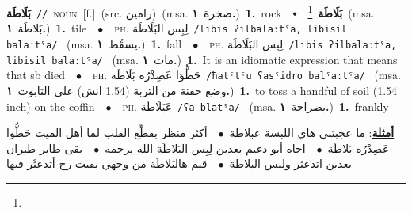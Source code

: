 \documentclass[10pt,a4paper,twoside]{article} %
\begin{document}
\begin{multicols}{2}
{\setlength\topsep{0pt}\textbf{\foreignlanguage{arabic}{بَلَاطَة}}\ {\color{gray}\texttt{//}\color{black}}\ \textsc{noun}\ [f.]\ (src. \color{gray}\foreignlanguage{arabic}{رامين}\color{black})\ \color{gray}(msa. \foreignlanguage{arabic}{صخرة}~\foreignlanguage{arabic}{\textbf{١.}})\color{black}\ \textbf{1.}~rock\ \ $\smblkdiamond$\ \ \setlength\topsep{0pt}\textbf{\foreignlanguage{arabic}{بَلَاطَة}}\ \footnote{}\ \color{gray}(msa. \foreignlanguage{arabic}{بَلاطَة}~\foreignlanguage{arabic}{\textbf{١.}})\color{black}\ \textbf{1.}~tile\ \ $\bullet$\ \ \textsc{ph.} \color{gray} \foreignlanguage{arabic}{لِبِس البَلَاطَة}\color{black}\ {\color{gray}\texttt{/{\sffamily libis ʔilbalaːtˤa, libisil balaːtˤa}/}\color{black}}\ \color{gray} (msa. \foreignlanguage{arabic}{يسقُط}~\foreignlanguage{arabic}{\textbf{١.}})\color{black}\ \textbf{1.}~fall\ \ $\bullet$\ \ \textsc{ph.} \color{gray} \foreignlanguage{arabic}{لِبِس البَلَاطَة}\color{black}\ {\color{gray}\texttt{/{\sffamily libis ʔilbalaːtˤa, libisil balaːtˤa}/}\color{black}}\ \color{gray} (msa. \foreignlanguage{arabic}{مات}~\foreignlanguage{arabic}{\textbf{١.}})\color{black}\ \textbf{1.}~It is an idiomatic expression that means that sb died\ \ $\bullet$\ \ \textsc{ph.} \color{gray} \foreignlanguage{arabic}{حَطُّوَا عَصِدْرُه بَلَاطَة}\color{black}\ {\color{gray}\texttt{/{\sffamily ħatˤtˤu ʕasˤidro balˤaːtˤa}/}\color{black}}\ \color{gray} (msa. \foreignlanguage{arabic}{وضع حفنة من التربة (1.54 انش) على التابوت}~\foreignlanguage{arabic}{\textbf{١.}})\color{black}\ \textbf{1.}~to toss a handful of soil (1.54 inch) on the coffin\ \ $\bullet$\ \ \textsc{ph.} \color{gray} \foreignlanguage{arabic}{عَبَلَاطَة}\color{black}\ {\color{gray}\texttt{/{\sffamily ʕa blatˤa}/}\color{black}}\ \color{gray} (msa. \foreignlanguage{arabic}{بصراحة}~\foreignlanguage{arabic}{\textbf{١.}})\color{black}\ \textbf{1.}~frankly\  \begin{flushright}\color{gray}\foreignlanguage{arabic}{\textbf{\underline{\foreignlanguage{arabic}{أمثلة}}}: ما عجبتني هاي اللبسة عبلاطة\ $\bullet$\ \  أكثر منظر بقطِّع القلب لما أهل الميت حَطُّوا عَصِدْرُه بَلاطَة\ $\bullet$\ \  اجاه أبو دغيم بعدين لِبِس البَلاطَة الله يرحمه\ $\bullet$\ \  بقى طاير طيران بعدين اتدعثر ولبس البلاطة\ $\bullet$\ \  قيم هالبَلاطَة من وجهي بقيت رح أتدعثَر فيها}\end{flushright}\color{black}} \vspace{2mm}


\end{multicols}
\end{document}
